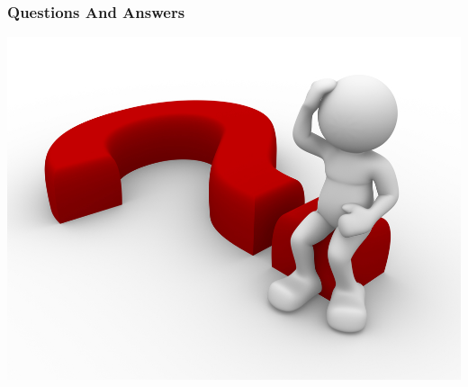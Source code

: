 \documentclass[]{beamer}
\begin{document}
\begin{frame}
  \frametitle{Questions And Answers}
  \begin{center}
    \includegraphics[scale=0.85]{figures/questions_answers_5.jpg}  
  \end{center}
\end{frame}
\end{document}
